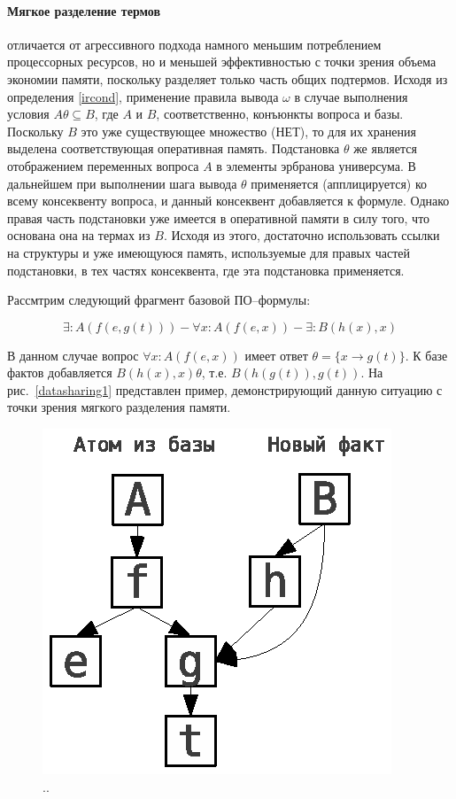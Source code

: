 \paragraph{Мягкое разделение термов} отличается от агрессивного подхода намного меньшим потреблением процессорных ресурсов, но и меньшей эффективностью с точки зрения объема экономии памяти, поскольку разделяет только часть общих подтермов. Исходя из определения \ref{ircond}, применение правила вывода $\omega$  в случае выполнения условия $A\theta \subseteq B$, где $A$ и $B$, соответственно, конъюнкты вопроса и базы. Поскольку $B$ это уже существующее множество  (НЕТ), то для их хранения выделена соответствующая оперативная память. Подстановка $\theta$ же является отображением переменных вопроса $A$ в элементы эрбранова универсума. В дальнейшем при выполнении шага вывода $\theta$ применяется (апплицируется) ко всему консеквенту вопроса, и данный консеквент добавляется к формуле. Однако правая часть подстановки уже имеется в оперативной памяти в силу того, что основана она на термах из $B$. Исходя из этого, достаточно использовать ссылки на структуры и уже имеющуюся память, используемые для правых частей подстановки, в тех частях консеквента, где эта подстановка применяется.

Рассмтрим следующий фрагмент базовой ПО--формулы:

$$ \exists:A(f(e,g(t))) - \forall x:A(f(e,x)) - \exists:B(h(x),x) $$

В данном случае вопрос $\forall x:A(f(e,x))$ имеет ответ $\theta = \{x \rightarrow g(t)\}$. К базе фактов добавляется $B(h(x),x)\theta$, т.е. $B(h(g(t)),g(t))$. На рис.~\ref{datasharing1} представлен пример, демонстрирующий данную ситуацию с точки зрения мягкого разделения памяти.
\begin{figure}[h]
	\centering
	\includegraphics[width=0.3\linewidth]{pics/DataSharing1.eps}
	\caption{..}
	\label{fig:datasharing1}
\end{figure}

